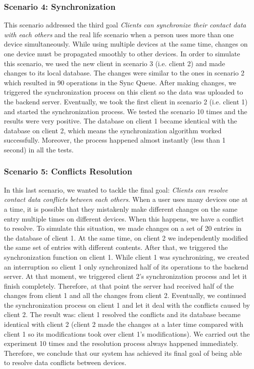 \subsubsection{Scenario 4: Synchronization}
This scenario addressed the third goal \textit{Clients can synchronize their contact data with each others} and the real life scenario when a person uses more than one device simultaneously. While using multiple devices at the same time, changes on one device must be propagated smoothly to other devices. In order to simulate this scenario, we used the new client in scenario 3 (i.e. client 2) and made changes to its local database. The changes were similar to the ones in scenario 2 which resulted in 90 operations in the Sync Queue. After making changes, we triggered the synchronization process on this client so the data was uploaded to the backend server. Eventually, we took the first client in scenario 2 (i.e. client 1) and started the synchronization process. We tested the scenario 10 times and the results were very positive. The database on client 1 became identical with the database on client 2, which means the synchronization algorithm worked successfully. Moreover, the process happened almost instantly (less than 1 second) in all the tests.

\subsubsection{Scenario 5: Conflicts Resolution}
In this last scenario, we wanted to tackle the final goal: \textit{Clients can resolve contact data conflicts between each others}. When a user uses many devices one at a time, it is possible that they mistakenly make different changes on the same entry multiple times on different devices. When this happens, we have a conflict to resolve. To simulate this situation, we made changes on a set of 20 entries in the database of client 1. At the same time, on client 2 we independently modified the same set of entries with different contents. After that, we triggered the synchronization function on client 1. While client 1 was synchronizing, we created an interruption so client 1 only synchronized half of its operations to the backend server. At that moment, we triggered client 2's synchronization process and let it finish completely. Therefore, at that point the server had received half of the changes from client 1 and all the changes from client 2. Eventually, we continued the synchronization process on client 1 and let it deal with the conflicts caused by client 2. The result was: client 1 resolved the conflicts and its database became identical with client 2 (client 2 made the changes at a later time compared with client 1 so its modifications took over client 1's modifications). We carried out the experiment 10 times and the resolution process always happened immediately. Therefore, we conclude that our system has achieved its final goal of being able to resolve data conflicts between devices.

